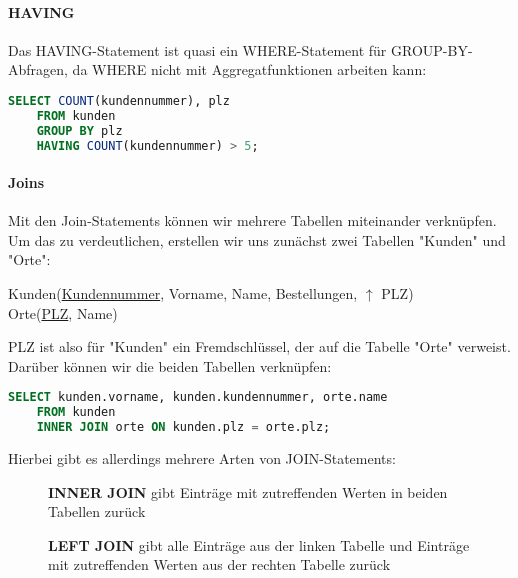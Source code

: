 \documentclass{article}
\begin{document}
	\paragraph{HAVING}
	Das HAVING-Statement ist quasi ein WHERE-Statement für GROUP-BY-Abfragen, da WHERE nicht mit Aggregatfunktionen arbeiten kann:

	\begin{lstlisting}[language=SQL, caption=Orte mit mehr als 5 Kunden]
	SELECT COUNT(kundennummer), plz 
	FROM kunden 
	GROUP BY plz 
	HAVING COUNT(kundennummer) > 5;
	\end{lstlisting}

	\paragraph{Joins}
	Mit den Join-Statements können wir mehrere Tabellen miteinander verknüpfen. Um das zu verdeutlichen, erstellen wir uns zunächst zwei Tabellen "Kunden" und "Orte":

	\begin{center}
		Kunden(\underline{Kundennummer}, Vorname, Name, Bestellungen, $\uparrow$ PLZ) \\
		Orte(\underline{PLZ}, Name)
	\end{center}

	PLZ ist also für "Kunden" ein Fremdschlüssel, der auf die Tabelle "Orte" verweist. Darüber können wir die beiden Tabellen verknüpfen:

	\begin{lstlisting}[language=SQL, caption=Wir erhalten Vornamen sowie Kundennummern und dazugehörige Ortsnamen]
	SELECT kunden.vorname, kunden.kundennummer, orte.name
	FROM kunden
	INNER JOIN orte ON kunden.plz = orte.plz;
	\end{lstlisting}

	Hierbei gibt es allerdings mehrere Arten von JOIN-Statements:

	\begin{figure}[h!]
		\centering
		
		\caption{\textbf{INNER JOIN} gibt Einträge mit zutreffenden Werten in beiden Tabellen zurück}
	\end{figure}

	\begin{figure}[h!]
		\centering
		
		\caption{\textbf{LEFT JOIN} gibt alle Einträge aus der linken Tabelle und Einträge mit zutreffenden Werten aus der rechten Tabelle zurück}
	\end{figure}
\end{document}
